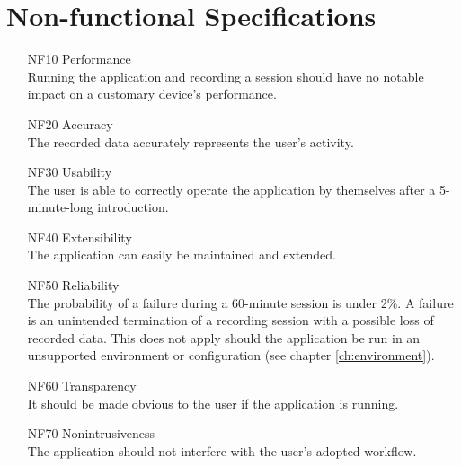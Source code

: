 \chapter{Non-functional Specifications}
\label{ch:nonfunc}
\begin{itemize}
    \item[NF10] Performance\\Running the application and recording a \gls{session} should have no notable impact on a customary \gls{device}'s performance.
    \item[NF20] Accuracy\\The recorded data accurately represents the \gls{user}'s activity. %
    \item[NF30] Usability\\The \gls{user} is able to correctly operate the application by themselves after a 5-minute-long introduction.
    \item[NF40] Extensibility\\The application can easily be maintained and extended.
    \item[NF50] Reliability\\The probability of a failure during a 60-minute \gls{session} is under 2\%. A failure is an unintended termination of a recording \gls{session} with a possible loss of recorded data. This does not apply should the application be run in an unsupported environment or configuration (see chapter \ref{ch:environment}).%
    \item[NF60] Transparency\\It should be made obvious to the \gls{user} if the application is running.
    \item[NF70] Nonintrusiveness\\The application should not interfere with the \gls{user}'s adopted workflow.
\end{itemize}
